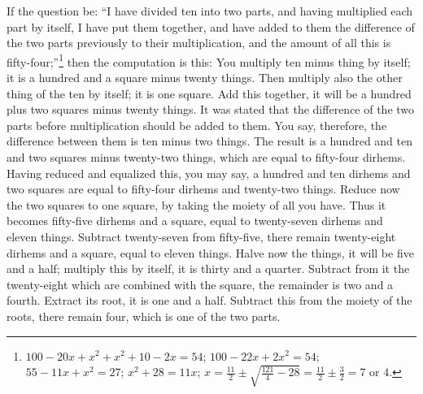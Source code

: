 If the question be: ``I have divided ten into two parts, and having multiplied each part by itself, I have put them together, and have added to them the difference of the two parts previously to their multiplication, and the amount of all this is fifty-four;''\footnote{$100 - 20x + x^2 + x^2 + 10 - 2x = 54$; $100 - 22x + 2x^2 = 54$; $55 - 11x + x^2 = 27$; $x^2 + 28 = 11x$; $x = \frac{11}{2} \pm \sqrt{\frac{121}{4} - 28} = \frac{11}{2} \pm \frac{3}{2} = 7$ or $4$.} then the computation is this: You multiply ten minus thing by itself; it is a hundred and a square minus twenty things. Then multiply also the other thing of the ten by itself; it is one square. Add this together, it will be a hundred plus two squares minus twenty things. It was stated that the difference of the two parts before multiplication should be added to them. You say, therefore, the difference between them is ten minus two things. The result is a hundred and ten and two squares minus twenty-two things, which are equal to fifty-four dirhems. Having reduced and equalized this, you may say, a hundred and ten dirhems and two squares are equal to fifty-four dirhems and twenty-two things. Reduce now the two squares to one square, by taking the moiety of all you have. Thus it becomes fifty-five dirhems and a square, equal to twenty-seven dirhems and eleven things. Subtract twenty-seven from fifty-five, there remain twenty-eight dirhems and a square, equal to eleven things. Halve now the things, it will be five and a half; multiply this by itself, it is thirty and a quarter. Subtract from it the twenty-eight which are combined with the square, the remainder is two and a fourth. Extract its root, it is one and a half. Subtract this from the moiety of the roots, there remain four, which is one of the two parts.


